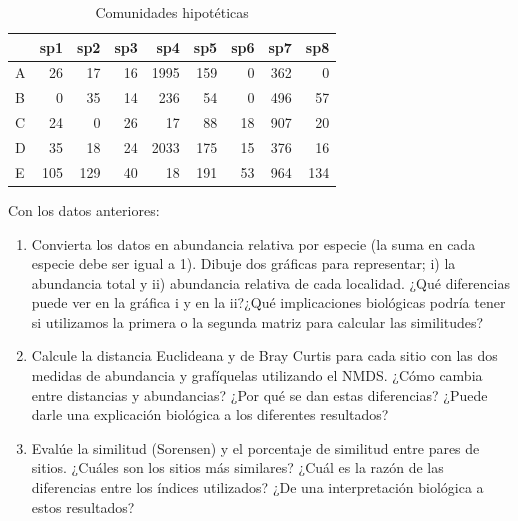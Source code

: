\documentclass[]{book}
\begin{document}
\begin{table}

\caption{\label{tab:unnamed-chunk-37}Comunidades hipotéticas}
\centering
\begin{tabular}[t]{lrrrrrrrr}
\toprule
  & sp1 & sp2 & sp3 & sp4 & sp5 & sp6 & sp7 & sp8\\
\midrule
A & 26 & 17 & 16 & 1995 & 159 & 0 & 362 & 0\\
B & 0 & 35 & 14 & 236 & 54 & 0 & 496 & 57\\
C & 24 & 0 & 26 & 17 & 88 & 18 & 907 & 20\\
D & 35 & 18 & 24 & 2033 & 175 & 15 & 376 & 16\\
E & 105 & 129 & 40 & 18 & 191 & 53 & 964 & 134\\
\bottomrule
\end{tabular}
\end{table}

Con los datos anteriores:

\begin{enumerate}
\def\labelenumi{\alph{enumi}.}
\item
  Convierta los datos en abundancia relativa por especie (la suma en
  cada especie debe ser igual a 1). Dibuje dos gráficas para
  representar; i) la abundancia total y ii) abundancia relativa de cada
  localidad. ¿Qué diferencias puede ver en la gráfica i y en la ii?¿Qué
  implicaciones biológicas podría tener si utilizamos la primera o la
  segunda matriz para calcular las similitudes?
\item
  Calcule la distancia Euclideana y de Bray Curtis para cada sitio con
  las dos medidas de abundancia y grafíquelas utilizando el NMDS. ¿Cómo
  cambia entre distancias y abundancias? ¿Por qué se dan estas
  diferencias? ¿Puede darle una explicación biológica a los diferentes
  resultados?
\item
  Evalúe la similitud (Sorensen) y el porcentaje de similitud entre
  pares de sitios. ¿Cuáles son los sitios más similares? ¿Cuál es la
  razón de las diferencias entre los índices utilizados? ¿De una
  interpretación biológica a estos resultados?
\end{enumerate}


\end{document}
